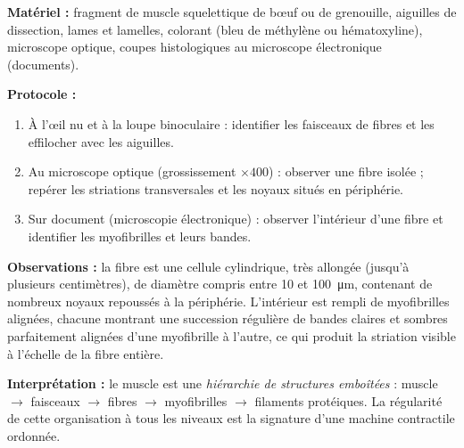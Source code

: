 \documentclass[11pt]{article}
\begin{document}
\begin{experience}
\textbf{Matériel :} fragment de muscle squelettique de bœuf ou de grenouille, aiguilles de dissection, lames et lamelles, colorant (bleu de méthylène ou hématoxyline), microscope optique, coupes histologiques au microscope électronique (documents).

\textbf{Protocole :}
\begin{enumerate}
\item À l'œil nu et à la loupe binoculaire : identifier les faisceaux de fibres et les effilocher avec les aiguilles.
\item Au microscope optique (grossissement $\times 400$) : observer une fibre isolée ; repérer les striations transversales et les noyaux situés en périphérie.
\item Sur document (microscopie électronique) : observer l'intérieur d'une fibre et identifier les myofibrilles et leurs bandes.
\end{enumerate}

\textbf{Observations :} la fibre est une cellule cylindrique, très allongée (jusqu'à plusieurs centimètres), de diamètre compris entre \num{10} et \SI{100}{\micro\metre}, contenant de nombreux noyaux repoussés à la périphérie. L'intérieur est rempli de myofibrilles alignées, chacune montrant une succession régulière de bandes claires et sombres parfaitement alignées d'une myofibrille à l'autre, ce qui produit la striation visible à l'échelle de la fibre entière.

\textbf{Interprétation :} le muscle est une \emph{hiérarchie de structures emboîtées} : muscle $\rightarrow$ faisceaux $\rightarrow$ fibres $\rightarrow$ myofibrilles $\rightarrow$ filaments protéiques. La régularité de cette organisation à tous les niveaux est la signature d'une machine contractile ordonnée.
\end{experience}
\end{document}
